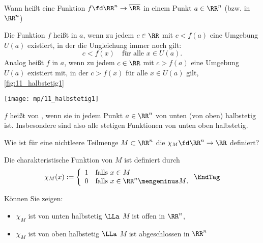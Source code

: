\begin{frage}
  Wann heißt eine Funktion $f\fd \RR^n \to\overline{\RR}$ 
  in einem Punkt $a\in \RR^n$ (bzw. in $\RR^n$)
\end{frage}

\begin{antwort}
   Die Funktion $f$ hei{\ss}t 
   in $a$, wenn zu jedem 
  $c\in\RR$ mit $c<f(a)$ eine Umgebung $U(a)$ existiert, 
  in der die Ungleichung immer noch gilt: 
  \[
  c<f(x) \quad\text{f\"ur alle $x\in U(a)$}.
  \]
   Analog heißt $f$  in $a$, 
  wenn zu jedem $c\in\RR$ mit $c>f(a)$ eine Umgebung 
  $U(a)$ existiert mit, in der $c>f(x)$ 
  f\"ur alle $x\in U(a)$ gilt, \sieheAbbildung\ref{fig:11_halbstetig1}

  \begin{center}
    \texttt{[image: mp/11\_halbstetig1]}
    \label{fig:11_halbstetig1}
  \end{center}

  $f$ hei{\ss}t von , wenn sie in jedem Punkt $a\in\RR^n$ von unten (von oben) 
  halbstetig ist. 
  Insbesondere sind also alle stetigen Funktionen 
  von unten  oben halbstetig. 
  \AntEnd
\end{antwort} 

\begin{frage}
  Wie ist f\"ur eine nichtleere Teilmenge $M\subset \RR^n$ die 
   $\chi_M \fd \RR^n \to \RR$ 
  definiert?
\end{frage}

\begin{antwort}
  Die charakteristische Funktion von $M$ ist definiert durch
  \[
  {\chi}_M (x) := \left\{ \begin{array}{ll} 1 & \text{falls $x\in M$} \\
      0 & \text{falls $x\in \RR^n \mengeminus M$}. 
    \end{array}
  \right.
  \EndTag
  \]
\end{antwort} 

\begin{frage}\label{11_charakhalb}
  K\"onnen Sie zeigen: 
  \begin{itemize}[1mm]
  \item[\desc{a}] 
    ${\chi}_M$ ist von unten halbstetig $\LLa$ $M$ ist offen in $\RR^n$, 
    \\[-3.5mm] 
  \item[\desc{b}] ${\chi}_M$ ist von oben halbstetig $\LLa$ $M$ ist 
    abgeschlossen in $\RR^n$ 
  \end{itemize}
\end{frage}

